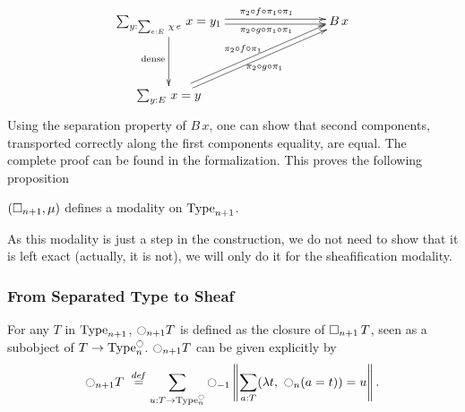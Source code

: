 \[\xymatrix@C=8em@R=4em{
  \sumD y {\sumD e E {\chi\,
  e}} {x=y_1} \ar@<2pt>[r]^{\qquad \pi_2\circ f\circ\pi_1\circ \pi_1}
\ar@<-2pt>[r]_{\qquad \pi_2\circ g\circ \pi_1\circ \pi_1}
\ar[d]_{\mathrm{dense}}& B\,x \\
  \sumD y E {x = y} \ar@<2pt>[ur]^{\pi_2\circ f\circ \pi_1} \ar@<-2pt>[ur]_{\pi_2\circ g\circ \pi_1}&
}\]%
Using the separation property of $B\,x$, one can show that second
components, transported correctly along the first components equality,
are equal. The complete proof can be found in the formalization.
This proves the following proposition
\begin{prop}\label{prop:sep-mod}
  $(\mathop{\square_{n+1}},\mu)$ defines a modality on $\operatorname{Type}_{n+1}$.
\end{prop}

As this modality is just a step in the construction, we do not need to
show that it is left exact (actually, it is not), we will only do it for the sheafification
modality.

\subsubsection{From Separated Type to Sheaf}
\label{sssec:separated-to-sheaf}

For any $T$ in $\operatorname{Type}_{n+1}$, 
$\ocircle_{n+1}T$ is defined as the closure of $\mathop{\square_{n+1}} T$,
seen as a subobject of $T \to \operatorname{Type}_n^{\ocircle}$. 
%
$\ocircle_{n+1}T$ can be given explicitly by
\[
\ocircle_{n+1} T \ \overset{de\hspace{-0.2ex}f}{=} \sum_{u:T \to \operatorname{Type}_n^{\ocircle}} \ocircle_{-1}\left\| \sum_{a:T} 
            (\lambda t,~\ocircle_n (a=t)) = u\right\|.
\]%

